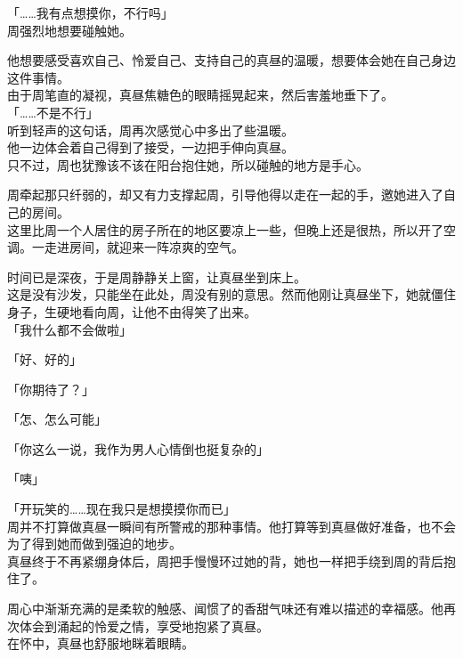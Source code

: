 「……我有点想摸你，不行吗」\\

周强烈地想要碰触她。

他想要感受喜欢自己、怜爱自己、支持自己的真昼的温暖，想要体会她在自己身边这件事情。\\

由于周笔直的凝视，真昼焦糖色的眼睛摇晃起来，然后害羞地垂下了。\\

「……不是不行」\\

听到轻声的这句话，周再次感觉心中多出了些温暖。\\

他一边体会着自己得到了接受，一边把手伸向真昼。\\

只不过，周也犹豫该不该在阳台抱住她，所以碰触的地方是手心。

周牵起那只纤弱的，却又有力支撑起周，引导他得以走在一起的手，邀她进入了自己的房间。\\

这里比周一个人居住的房子所在的地区要凉上一些，但晚上还是很热，所以开了空调。一走进房间，就迎来一阵凉爽的空气。

时间已是深夜，于是周静静关上窗，让真昼坐到床上。\\

这是没有沙发，只能坐在此处，周没有别的意思。然而他刚让真昼坐下，她就僵住身子，生硬地看向周，让他不由得笑了出来。\\

「我什么都不会做啦」

「好、好的」

「你期待了？」

「怎、怎么可能」

「你这么一说，我作为男人心情倒也挺复杂的」

「咦」

「开玩笑的……现在我只是想摸摸你而已」\\

周并不打算做真昼一瞬间有所警戒的那种事情。他打算等到真昼做好准备，也不会为了得到她而做到强迫的地步。\\

真昼终于不再紧绷身体后，周把手慢慢环过她的背，她也一样把手绕到周的背后抱住了。

周心中渐渐充满的是柔软的触感、闻惯了的香甜气味还有难以描述的幸福感。他再次体会到涌起的怜爱之情，享受地抱紧了真昼。\\

在怀中，真昼也舒服地眯着眼睛。

